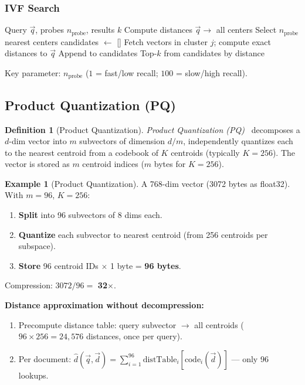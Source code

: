 \documentclass[11pt,a4paper]{article}
\theoremstyle{definition}
\newtheorem{definition}{Definition}[section]
\newtheorem{example}{Example}[section]
\theoremstyle{plain}
\begin{document}
\subsubsection{IVF Search}

\begin{algorithm}[H]
\caption{IVF Search}
\begin{algorithmic}[1]
\REQUIRE Query $\vec{q}$, probes $n_{\mathrm{probe}}$, results $k$
\STATE Compute distances $\vec{q} \to$ all centers
\STATE Select $n_{\mathrm{probe}}$ nearest centers
\STATE candidates $\gets$ []
    \STATE Fetch vectors in cluster $j$; compute exact distances to $\vec{q}$
    \STATE Append to candidates
\ENDFOR
\RETURN Top-$k$ from candidates by distance
\end{algorithmic}
\end{algorithm}

Key parameter: $n_{\mathrm{probe}}$ ($1$ = fast/low recall; $100$ = slow/high recall).

\subsection{Product Quantization (PQ)}

\begin{definition}[Product Quantization]
\emph{Product Quantization (PQ)}~\cite{jegou2011product} decomposes a $d$-dim vector into $m$ subvectors of dimension $d/m$, independently quantizes each to the nearest centroid from a codebook of $K$ centroids (typically $K=256$). The vector is stored as $m$ centroid indices ($m$ bytes for $K=256$).
\end{definition}

\begin{example}[Product Quantization]
A 768-dim vector (3072 bytes as float32). With $m = 96$, $K = 256$:
\begin{enumerate}[nosep]
    \item \textbf{Split} into 96 subvectors of 8 dims each.
    \item \textbf{Quantize} each subvector to nearest centroid (from 256 centroids per subspace).
    \item \textbf{Store} 96 centroid IDs $\times$ 1 byte = \textbf{96 bytes}.
\end{enumerate}
Compression: $3072 / 96 = $ \textbf{32$\times$}.

\textbf{Distance approximation without decompression:}
\begin{enumerate}[nosep]
    \item Precompute distance table: query subvector $\to$ all centroids ($96 \times 256 = 24{,}576$ distances, once per query).
    \item Per document: $\hat{d}(\vec{q}, \vec{d}) = \sum_{i=1}^{96} \mathrm{distTable}_i[\mathrm{code}_i(\vec{d})]$ --- only 96 lookups.
\end{enumerate}
\end{example}
\end{document}
